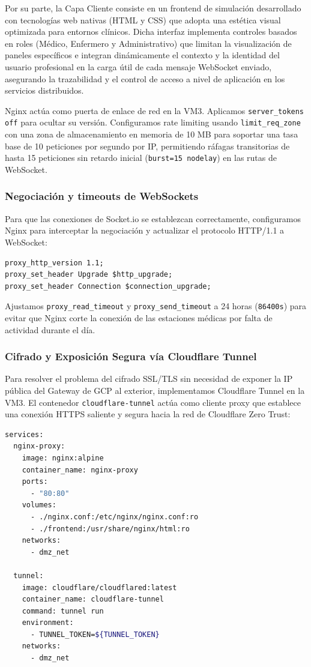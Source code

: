 \documentclass[11pt,a4paper]{article}
\begin{document}
Por su parte, la Capa Cliente consiste en un frontend de simulación desarrollado con tecnologías web nativas (HTML y CSS) que adopta una estética visual optimizada para entornos clínicos. Dicha interfaz implementa controles basados en roles (Médico, Enfermero y Administrativo) que limitan la visualización de paneles específicos e integran dinámicamente el contexto y la identidad del usuario profesional en la carga útil de cada mensaje WebSocket enviado, asegurando la trazabilidad y el control de acceso a nivel de aplicación en los servicios distribuidos.

Nginx actúa como puerta de enlace de red en la VM3. Aplicamos \texttt{server\_tokens off} para ocultar su versión. Configuramos rate limiting usando \texttt{limit\_req\_zone} con una zona de almacenamiento en memoria de 10 MB para soportar una tasa base de 10 peticiones por segundo por IP, permitiendo ráfagas transitorias de hasta 15 peticiones sin retardo inicial (\texttt{burst=15 nodelay}) en las rutas de WebSocket.

\subsubsection{Negociación y timeouts de WebSockets}
Para que las conexiones de Socket.io se establezcan correctamente, configuramos Nginx para interceptar la negociación y actualizar el protocolo HTTP/1.1 a WebSocket:
\begin{verbatim}
proxy_http_version 1.1;
proxy_set_header Upgrade $http_upgrade;
proxy_set_header Connection $connection_upgrade;
\end{verbatim}
Ajustamos \texttt{proxy\_read\_timeout} y \texttt{proxy\_send\_timeout} a 24 horas (\texttt{86400s}) para evitar que Nginx corte la conexión de las estaciones médicas por falta de actividad durante el día.

\subsubsection{Cifrado y Exposición Segura vía Cloudflare Tunnel}
Para resolver el problema del cifrado SSL/TLS sin necesidad de exponer la IP pública del Gateway de GCP al exterior, implementamos Cloudflare Tunnel en la VM3. El contenedor \texttt{cloudflare-tunnel} actúa como cliente proxy que establece una conexión HTTPS saliente y segura hacia la red de Cloudflare Zero Trust:

\begin{lstlisting}[language=bash, caption=Integración del túnel en la VM3 (directorio VM3/docker-compose.yml)]
services:
  nginx-proxy:
    image: nginx:alpine
    container_name: nginx-proxy
    ports:
      - "80:80"
    volumes:
      - ./nginx.conf:/etc/nginx/nginx.conf:ro
      - ./frontend:/usr/share/nginx/html:ro
    networks:
      - dmz_net

  tunnel:
    image: cloudflare/cloudflared:latest
    container_name: cloudflare-tunnel
    command: tunnel run
    environment:
      - TUNNEL_TOKEN=${TUNNEL_TOKEN}
    networks:
      - dmz_net
\end{lstlisting}
\end{document}
